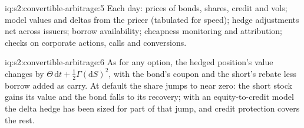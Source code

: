 \begin{solution}{iq:s2:convertible-arbitrage:5}
Each day: prices of bonds, shares, credit and vols; model values and deltas from the pricer (tabulated for speed); hedge adjustments net across
issuers; borrow availability; cheapness monitoring and attribution; checks on corporate actions, calls and conversions.
\end{solution}

\begin{solution}{iq:s2:convertible-arbitrage:6}
As for any option, the hedged position's value changes by $\Theta\,\mathrm{d}t + \tfrac12\Gamma(\mathrm{d}S)^2$, with the bond's coupon and the short's
rebate less borrow added as carry. At default the share jumps to near zero: the short stock gains its value and the bond falls to its recovery; with
an equity-to-credit model the delta hedge has been sized for part of that jump, and credit protection covers the rest.
\end{solution}
